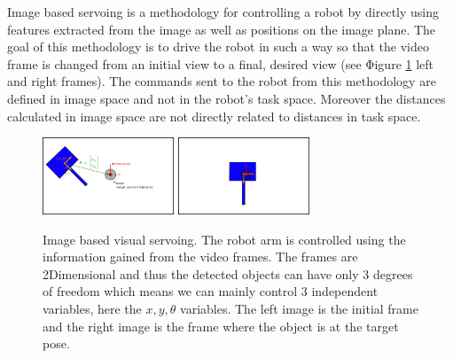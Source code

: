 Image based servoing is a methodology for controlling a robot by directly using features extracted from the image as well as positions on the image plane. The goal of this methodology is to drive the robot in such a way so that the video frame is changed from an initial view to a final, desired view (see Φigure \ref{image-based-servoing-start-end} left and right frames). The commands sent to the robot from this methodology are defined in image space and not in the robot's task space. Moreover the distances calculated in image space are not directly related to distances 
in task space.

\begin{center}
\begin{figure}[htbπ]
\centering
\includegraphics[width=0.35\textwidth]{images/visual_servo_start.png}
\includegraphics[width=0.35\textwidth]{images/visual_servo_end.png}\\
\caption{Image based visual servoing. The robot arm is controlled using the information gained from the video frames. The frames are 2Dimensional and thus 
the detected objects can have only 3 degrees of freedom which means we can mainly control 3 independent variables, here the $x,y,θ$ variables. The left image 
is the initial frame and the right image is the frame where the object is at the target pose.}
\label{image-based-servoing-start-end}
\end{figure}
\end{center}

